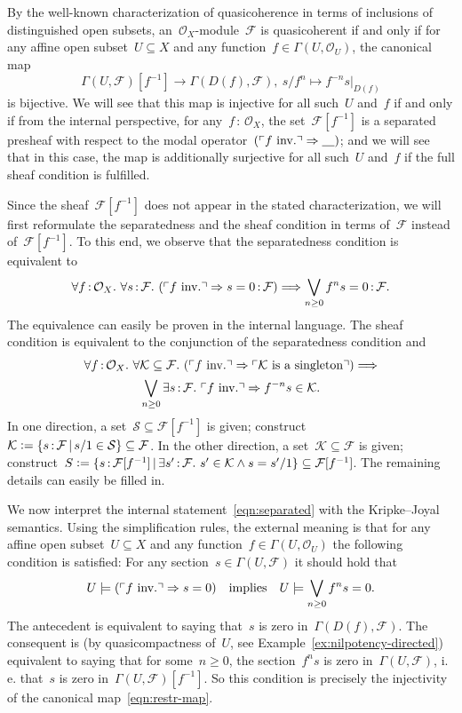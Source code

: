 \documentclass[10pt,reqno,a4paper]{amsbook}
\makeatletter
\theoremstyle{definition}
\theoremstyle{plain}
\theoremstyle{remark}
\newcommand{\F}{\mathcal{F}}
\renewcommand{\O}{\mathcal{O}}
\newcommand{\K}{\mathcal{K}}
\renewcommand{\S}{\mathcal{S}}
\newcommand{\placeholder}{\underline{\quad}}
\newcommand{\?}{\,{:}\,}
\renewcommand{\_}{\mathpunct{.}\,}
\newcommand{\speak}[1]{\ulcorner\text{\textnormal{#1}}\urcorner}
\newcommand{\lra}{\longrightarrow}
\newcommand{\ie}{i.\,e.\@\xspace}
\newcommand{\inv}{inv.\@}
\newcommand{\defeq}{\vcentcolon=}
\renewenvironment{proof}[1][\proofname]{\par
  \pushQED{\qed}%
  \normalfont \topsep6\p@\@plus6\p@\relax
  \trivlist
  \item[\hskip\labelsep
        \itshape
    #1\@addpunct{.}]\ignorespaces
}{%
  \popQED\endtrivlist\@endpefalse
}
\makeatother
\begin{document}
\begin{proof}[Proof of Theorem~\ref{thm:qcoh-sheafchar}]
By the well-known characterization of quasicoherence in terms of inclusions of
distinguished open subsets, an~$\O_X$-module~$\F$ is quasicoherent if and only
if for any affine open subset~$U \subseteq X$ and any function~$f \in
\Gamma(U,\O_U)$, the canonical map
\begin{equation}\label{eqn:restr-map}
  \Gamma(U,\F)[f^{-1}] \lra \Gamma(D(f),\F), \ s/f^n \longmapsto
  f^{-n} s|_{D(f)}
\end{equation}
is bijective. We will see that this map is injective for all such~$U$ and~$f$
if and only if from the internal perspective, for any~$f\?\O_X$, the set~$\F[f^{-1}]$ is a
separated presheaf with respect to the modal operator~$(\speak{$f$ \inv}
\Rightarrow \placeholder)$; and we will see that in this
case, the map is additionally surjective for all such~$U$ and~$f$ if the full
sheaf condition is fulfilled.

Since the sheaf~$\F[f^{-1}]$ does not appear in the stated characterization, we
will first reformulate the separatedness and the sheaf condition in terms
of~$\F$ instead of~$\F[f^{-1}]$. To this end, we observe that the separatedness
condition is equivalent to
\begin{equation}\label{eqn:separated}
  \forall f\?\O_X\_ \forall s\?\F\_
  (\speak{$f$ \inv} \Rightarrow s = 0 \? \F) \Longrightarrow
  \bigvee_{n \geq 0} f^n s = 0 \? \F.
\end{equation}
The equivalence can easily be proven in the internal language. The sheaf
condition is equivalent to the conjunction of the separatedness condition and
\begin{multline}\label{eqn:sheaf}
  \forall f\?\O_X\_ \forall \K \subseteq \F\_
  (\speak{$f$ \inv} \Rightarrow \speak{$\K$ is a singleton})
  \Longrightarrow \\
  \bigvee_{n \geq 0} \exists s\?\F\_
  \speak{$f$ \inv} \Rightarrow f^{-n} s \in \K.
\end{multline}
In one direction, a set~$\S \subseteq \F[f^{-1}]$ is given; construct~$\K \defeq \{
s\?\F \,|\, s/1 \in \S \} \subseteq \F$. In the other direction, a set~$\K
\subseteq \F$ is given; construct~$S \defeq \{ s\?\F[f^{-1}] \,|\, \exists
s'\?\F\_ s' \in \K \wedge s = s'/1 \} \subseteq \F[f^{-1}]$. The remaining
details can easily be filled in.

We now interpret the internal statement~\eqref{eqn:separated} with the
Kripke--Joyal semantics. Using the simplification rules, the external meaning
is that for any affine open subset~$U \subseteq X$ and any function~$f \in
\Gamma(U,\O_U)$ the following condition is satisfied: For any section~$s \in
\Gamma(U,\F)$ it should hold that
\[ U \models (\speak{$f$ \inv} \Rightarrow s = 0) \quad\text{implies}\quad
  U \models \bigvee_{n \geq 0} f^n s = 0. \]
The antecedent is equivalent to saying that~$s$ is zero in~$\Gamma(D(f),\F)$.
The consequent is (by quasicompactness of~$U$, see
Example~\ref{ex:nilpotency-directed}) equivalent to saying that for some~$n \geq 0$, the
section~$f^n s$ is zero in~$\Gamma(U,\F)$, \ie that~$s$ is zero
in~$\Gamma(U,\F)[f^{-1}]$. So this condition is precisely the injectivity of
the canonical map~\eqref{eqn:restr-map}.


\end{proof}
\end{document}
